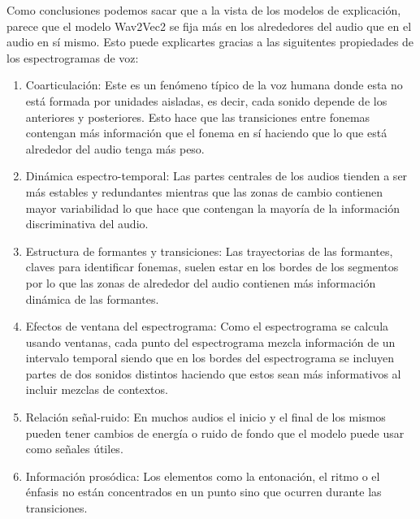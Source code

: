 Como conclusiones podemos sacar que a la vista de los modelos de explicación, parece que el modelo Wav2Vec2 se fija más en los alrededores del audio que en el audio en sí mismo. Esto puede explicartes gracias a las siguitentes propiedades de los espectrogramas de voz:

\begin{enumerate}

 \item Coarticulación: Este es un fenómeno típico de la voz humana donde esta no está formada por unidades aisladas, es decir, cada sonido depende de los anteriores y posteriores. Esto hace que las transiciones entre fonemas contengan más información que el fonema en sí haciendo que lo que está alrededor del audio tenga más peso.
 
 \item Dinámica espectro-temporal: Las partes centrales de los audios tienden a ser más estables y redundantes mientras que las zonas de cambio contienen mayor variabilidad lo que hace que contengan la mayoría de la información discriminativa del audio.
 
 \item Estructura de formantes y transiciones: Las trayectorias de las formantes, claves para identificar fonemas, suelen estar en los bordes de los segmentos por lo que las zonas de alrededor del audio contienen más información 	dinámica de las formantes.
 
 \item Efectos de ventana del espectrograma: Como el espectrograma se calcula usando ventanas, cada punto del espectrograma mezcla información de un intervalo temporal siendo que en los bordes del espectrograma se incluyen partes de dos sonidos distintos haciendo que estos sean más informativos al incluir mezclas de contextos.
 
 \item Relación señal-ruido: En muchos audios el inicio y el final de los mismos pueden tener cambios de energía o ruido de fondo que el modelo puede usar como señales útiles.
 
 \item Información prosódica: Los elementos como la entonación, el ritmo o el énfasis no están concentrados en un punto sino que ocurren durante las transiciones.

\end{enumerate}
